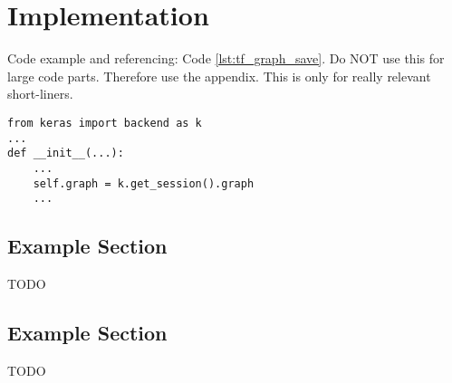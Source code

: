 \chapter{Implementation}
\label{cha:implmentation}
Code example and referencing: Code \ref{lst:tf_graph_save}. Do NOT use this for large code parts. Therefore use the appendix. This is only for really relevant short-liners.
\begin{lstlisting}[caption={Agent class - Tensorflow graph}, captionpos=b, label={lst:tf_graph_save}]
from keras import backend as k
...
def __init__(...):
	...
	self.graph = k.get_session().graph
	...
\end{lstlisting}

\section{Example Section}
TODO

\section{Example Section}
TODO